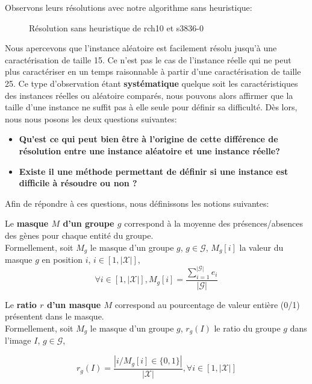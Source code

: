 Observons leurs résolutions avec notre algorithme sans heuristique:
\begin{figure}[H]
\centering
	\begin{minipage}[c]{0.49\linewidth}
	\centering
	
	\end{minipage}
	\begin{minipage}[c]{0.49\linewidth}
	\centering
	
	\end{minipage}
\caption{Résolution sans heuristique de rch10 et s3836-0}
\end{figure} 

Nous apercevons que l'instance aléatoire est facilement résolu jusqu'à une caractérisation de taille 15. Ce n'est pas le cas de l'instance réelle qui ne peut plus caractériser en un temps raisonnable à partir d'une caractérisation de taille 25. Ce type d'observation étant \textbf{systématique} quelque soit les caractéristiques des instances réelles ou aléatoire comparés, nous pouvons alors affirmer que la taille d'une instance ne suffit pas à elle seule pour définir sa difficulté. Dès lors, nous nous posons les deux questions suivantes:\\

\begin{itemize}
\item \textbf{Qu'est ce qui peut bien être à l'origine de cette différence de résolution entre une instance aléatoire et une instance réelle?}
\item \textbf{Existe il une méthode permettant de définir si une instance est difficile à résoudre ou non ?}\\
\end{itemize}
Afin de répondre à ces questions, nous définissons les notions suivantes:

\begin{definition}
Le \textbf{masque $M$ d'un groupe $g$} correspond à la moyenne des présences/absences des gènes pour chaque entité du groupe.\\
Formellement, soit $M_g$ le masque d'un groupe $g$, $g \in \mathcal{G}$, $M_g[i]$ la valeur du masque $g$ en position $i$, $i \in [1,|\mathcal{X}|]$,
$$\forall i \in  [1, |\mathcal{X}|], M_g[i]= \frac{\sum_{i=1}^{|\mathcal{G}|}e_i}{|\mathcal{G}|} $$
\end{definition}

\begin{definition}
Le \textbf{ratio $r$ d'un masque $M$} correspond au pourcentage de valeur entière (0/1) présentent dans le masque.\\
Formellement, soit $M_g$ le masque d'un groupe $g$, $r_g(I)$ le ratio du groupe $g$ dans l'image $I$, $g \in \mathcal{G}$,
\begin{center}
$$ r_g(I)=\frac{|{i / M_g[i] \in \{0,1\}}|}{|\mathcal{X}|},\forall i \in [1,|\mathcal{X}|]$$
\end{center}
\end{definition}

